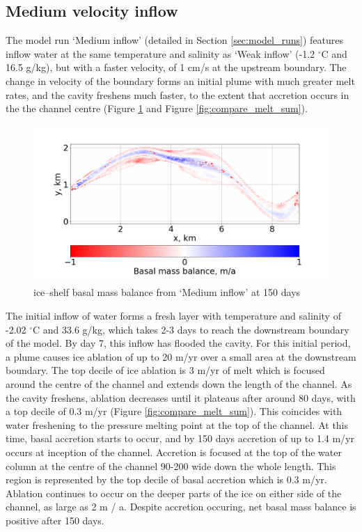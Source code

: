 

\subsection{Medium velocity inflow} \label{sec:medium_inflow}

The model run `Medium inflow' (detailed in Section \ref{sec:model_runs}) features inflow water at the same temperature and salinity as `Weak inflow' (-1.2 $^{\circ}$C and 16.5 g/kg), but with a faster velocity, of 1 cm/s at the upstream boundary. The change in velocity of the boundary forms an initial plume with much greater melt rates, and the cavity freshens much faster, to the extent that accretion occurs in the the channel centre (Figure \ref{fig:accretion} and Figure \ref{fig:compare_melt_sum}).

\begin{figure}[!ht]
\centering
\includegraphics[width=1\textwidth]{chapters/4/accretion.png}
\caption[]{ice--shelf basal mass balance from `Medium inflow' at 150 days}
\label{fig:accretion}
\end{figure}

The initial inflow of water forms a fresh layer with temperature and salinity of -2.02 $^{\circ}$C and 33.6  g/kg, which takes 2-3 days to reach the downstream boundary of the model. By day 7, this inflow has flooded the cavity.  
For this initial period, a plume causes ice ablation of up to 20 m/yr over a small area at the downstream boundary. The top decile of ice ablation is 3 m/yr of melt which is focused around the centre of the channel and extends down the length of the channel. As the cavity freshens, ablation decreases until it plateaus after around 80 days, with a top decile of 0.3 m/yr (Figure \ref{fig:compare_melt_sum}). This coincides with water freshening to the pressure melting point at the top of the channel. At this time, basal accretion starts to occur, and by 150 days accretion of up to 1.4 m/yr occurs at inception of the channel. Accretion is focused at the top of the water column at the centre of the channel 90-200 wide down the whole length. This region is represented by the top decile of basal accretion which is 0.3 m/yr. Ablation continues to occur on the deeper parts of the ice on either side of the channel, as large as 2 m / a. Despite accretion occuring, net basal mass balance is positive after 150 days.


